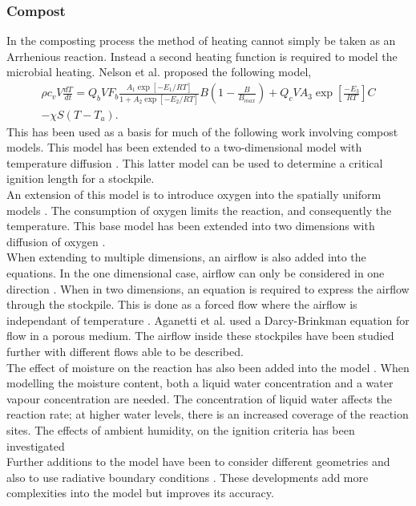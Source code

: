 \subsubsection{Compost}
In the composting process the method of heating cannot simply be taken as an Arrhenious reaction. Instead a second heating function is required to model the microbial heating.  Nelson et al.\cite{NELS03} proposed the following model,
\begin{multline}
\rho c_vV\frac{dT}{dt}=Q_bVF_b\frac{A_1\exp[-E_1/RT]}{1+A_2\exp[-E_2/RT]}B\left(1-\frac{B}{B_{max}}\right)+Q_cVA_3\exp\left[\frac{-E_3}{RT}\right]C\\-\chi S\left(T-T_a\right). \label{Bio}
\end{multline}
This has been used as a basis for much of the following work involving compost models. This model has been extended to a two-dimensional model with temperature diffusion \cite{sidhu06}. This latter model can be used to determine a critical ignition length for a stockpile.\\
An extension of this model is to introduce oxygen into the spatially uniform models \cite{nels07}.
The consumption of oxygen limits the reaction, and consequently the temperature. This base model has been extended into two dimensions with diffusion of oxygen \cite{Sidhu2007}.\\
When extending to multiple dimensions, an airflow is also added into the equations.
In the one dimensional case, airflow can only be considered in one direction \cite{luang09,luang10}. When in two dimensions, an equation is required to express the airflow through the stockpile. This is done as a forced flow where the airflow is independant of temperature \cite{luang10b,luang10c}. Aganetti et al. \cite{aga16} used a Darcy-Brinkman equation for flow in a porous medium. The airflow inside these stockpiles have been studied further with different flows able to be described. \cite{AGA17}\\
The  effect of moisture on the reaction has also been added into the model \cite{ZAM11,luang18,luang11a}. When modelling the moisture content, both a liquid water concentration and a water vapour concentration are needed. The concentration of liquid water affects the reaction rate; at higher water levels, there is an increased coverage of the reaction sites. The effects of ambient humidity, on the ignition criteria has been investigated \cite{luang18u} \\
Further additions to the model have been to consider different geometries \cite{luang11a} and also to use radiative boundary conditions \cite{luang10d,MOR09}. These developments add more complexities into the model but improves its accuracy.\\
